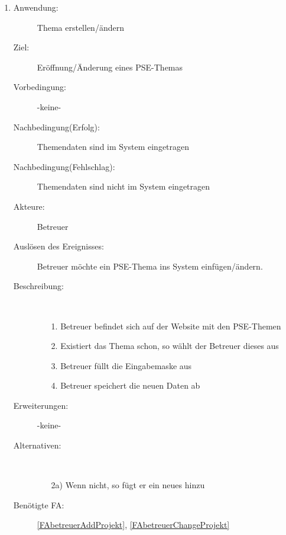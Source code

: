 \documentclass[parskip=full]{scrartcl}
\newcommand{\swtLabel}[1]{\textbf{/#1\arabic*0/}}
\begin{document}
\begin{enumerate} [label=\swtLabel{B}]
  
  \item \label{UCbetreuerThemaErstellenÄndern}
	\begin{description}
  		\item[Anwendung:] Thema erstellen/ändern
  		\item[Ziel:] Eröffnung/Änderung eines \gls{PSE}-Themas
  		\item[Vorbedingung:] -keine-
  		\item[Nachbedingung(Erfolg):] Themendaten sind im System eingetragen
  		\item[Nachbedingung(Fehlschlag):] Themendaten sind nicht im System
  		eingetragen
  		\item[Akteure:] Betreuer
  		\item[Auslösen des Ereignisses:] Betreuer möchte ein \gls{PSE}-Thema ins System
  		einfügen/ändern.
  		\item[Beschreibung:]~
  	\begin{enumerate}
  	  \item[1.] Betreuer befindet sich auf der Website mit den \gls{PSE}-Themen
  	  \item[2.] Existiert das Thema schon, so wählt der Betreuer dieses aus
  	  \item[3.] Betreuer füllt die Eingabemaske aus
  	  \item[4.] Betreuer speichert die neuen Daten ab
  	\end{enumerate}
  	\item[Erweiterungen:] -keine-
  	\item[Alternativen:]~
  	\begin{enumerate}
  	  \item[2a)] Wenn nicht, so fügt er ein neues hinzu
  	\end{enumerate}  
  	\item[Benötigte FA:] \ref{FAbetreuerAddProjekt}, \ref{FAbetreuerChangeProjekt}
  \end{description}


\end{enumerate}
\end{document}

